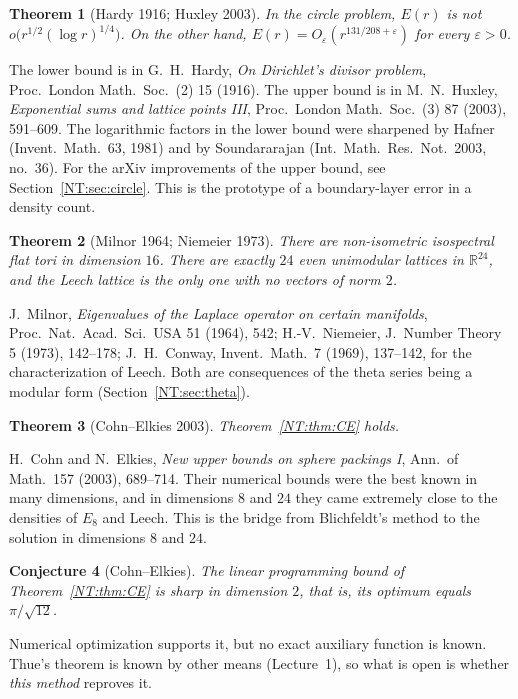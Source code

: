\documentclass[11pt,openany]{book}
\theoremstyle{plain}
\newtheorem{theorem}{Theorem}[chapter]
\newtheorem{conjecture}[theorem]{Conjecture}
\theoremstyle{definition}
\theoremstyle{remark}
\newcommand{\R}{\mathbb{R}}
\begin{document}
\begin{theorem}[Hardy 1916; Huxley 2003]\label{NT:gal:circle}
In the circle problem, $E(r)$ is not $o\big(r^{1/2}(\log r)^{1/4}\big)$. On the other hand,
$E(r)=O_\varepsilon(r^{131/208+\varepsilon})$ for every $\varepsilon>0$.
\end{theorem}
The lower bound is in G.~H.~Hardy, \emph{On Dirichlet's divisor problem}, Proc.\ London Math.\ Soc.\ (2)
15 (1916). The upper bound is in M.~N.~Huxley, \emph{Exponential sums and lattice points III}, Proc.\
London Math.\ Soc.\ (3) 87 (2003), 591--609. The logarithmic factors in the lower bound were sharpened
by Hafner (Invent.\ Math.\ 63, 1981) and by Soundararajan (Int.\ Math.\ Res.\ Not.\ 2003, no.~36). For
the arXiv improvements of the upper bound, see Section~\ref{NT:sec:circle}. This is the prototype of a boundary-layer error in a density count.

\begin{theorem}[Milnor 1964; Niemeier 1973]\label{NT:gal:niemeier}
There are non-isometric isospectral flat tori in dimension $16$. There are exactly $24$ even unimodular
lattices in $\R^{24}$, and the Leech lattice is the only one with no vectors of norm $2$.
\end{theorem}
J.~Milnor, \emph{Eigenvalues of the Laplace operator on certain manifolds}, Proc.\ Nat.\ Acad.\ Sci.\
USA 51 (1964), 542; H.-V.~Niemeier, J.\ Number Theory 5 (1973), 142--178; J.~H.~Conway, Invent.\ Math.\ 7
(1969), 137--142, for the characterization of Leech. Both are consequences of the theta series being a
modular form (Section~\ref{NT:sec:theta}).

\begin{theorem}[Cohn--Elkies 2003]\label{NT:gal:CE}
Theorem~\ref{NT:thm:CE} holds.
\end{theorem}
H.~Cohn and N.~Elkies, \emph{New upper bounds on sphere packings I}, Ann.\ of Math.\ 157 (2003), 689--714.
Their numerical bounds were the best known in many dimensions, and in dimensions $8$ and $24$ they came
extremely close to the densities of $E_8$ and Leech. This is the bridge from Blichfeldt's method to the solution in dimensions $8$ and $24$.

\begin{conjecture}[Cohn--Elkies]\label{NT:gal:CE2}
The linear programming bound of Theorem~\ref{NT:thm:CE} is sharp in dimension $2$, that is, its optimum
equals $\pi/\sqrt{12}$.
\end{conjecture}
Numerical optimization supports it, but no exact auxiliary function is known. Thue's
theorem is known by other means (Lecture~1), so what is open is whether \emph{this method} reproves it.
\end{document}
